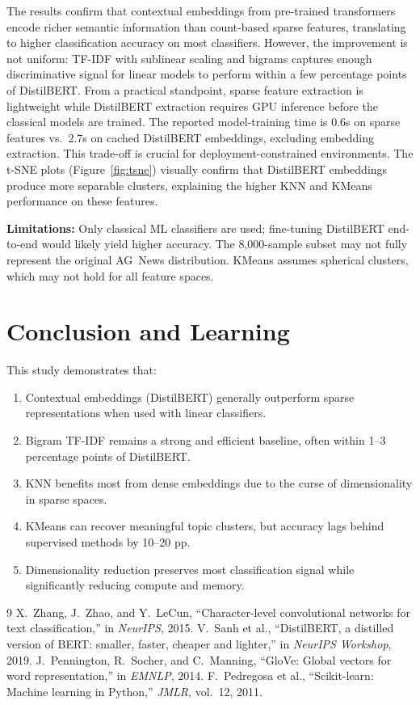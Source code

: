 \documentclass[11pt, a4paper, twocolumn]{article}
\begin{document}
The results confirm that contextual embeddings from pre-trained transformers encode richer semantic information than count-based sparse features, translating to higher classification accuracy on most classifiers. However, the improvement is not uniform: TF-IDF with sublinear scaling and bigrams captures enough discriminative signal for linear models to perform within a few percentage points of DistilBERT. From a practical standpoint, sparse feature extraction is lightweight while DistilBERT extraction requires GPU inference before the classical models are trained. The reported model-training time is 0.6s on sparse features vs.\ 2.7s on cached DistilBERT embeddings, excluding embedding extraction. This trade-off is crucial for deployment-constrained environments. The t-SNE plots (Figure~\ref{fig:tsne}) visually confirm that DistilBERT embeddings produce more separable clusters, explaining the higher KNN and KMeans performance on these features.

\textbf{Limitations:} Only classical ML classifiers are used; fine-tuning DistilBERT end-to-end would likely yield higher accuracy. The 8,000-sample subset may not fully represent the original AG~News distribution. KMeans assumes spherical clusters, which may not hold for all feature spaces.

\section{Conclusion and Learning}

This study demonstrates that:
\begin{enumerate}[leftmargin=*,topsep=2pt,itemsep=1pt]
    \item Contextual embeddings (DistilBERT) generally outperform sparse representations when used with linear classifiers.
    \item Bigram TF-IDF remains a strong and efficient baseline, often within 1--3 percentage points of DistilBERT.
    \item KNN benefits most from dense embeddings due to the curse of dimensionality in sparse spaces.
    \item KMeans can recover meaningful topic clusters, but accuracy lags behind supervised methods by 10--20 pp.
    \item Dimensionality reduction preserves most classification signal while significantly reducing compute and memory.
\end{enumerate}

\begin{thebibliography}{9}
 X.~Zhang, J.~Zhao, and Y.~LeCun, ``Character-level convolutional networks for text classification,'' in \emph{NeurIPS}, 2015.
 V.~Sanh et al., ``DistilBERT, a distilled version of BERT: smaller, faster, cheaper and lighter,'' in \emph{NeurIPS Workshop}, 2019.
 J.~Pennington, R.~Socher, and C.~Manning, ``GloVe: Global vectors for word representation,'' in \emph{EMNLP}, 2014.
 F.~Pedregosa et al., ``Scikit-learn: Machine learning in Python,'' \emph{JMLR}, vol.~12, 2011.
\end{thebibliography}
\end{document}
